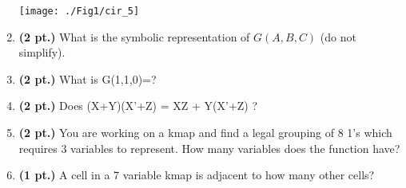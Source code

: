 \documentclass{article}
\begin{document}
\begin{enumerate}
\texttt{[image: ./Fig1/cir\_5]}

\item {\bf (2 pt.)} What is the symbolic representation of $G(A,B,C)$ 
(do not simplify).

\item {\bf (2 pt.)} What is G(1,1,0)=?

\item {\bf (2 pt.)} Does (X+Y)(X'+Z) = XZ + Y(X'+Z) ?

\pagebreak

\item {\bf (2 pt.)} You are working on a kmap and find a legal grouping 
of 8 1's which requires 3 variables to represent.  How many variables 
does the function have?

\item {\bf (1 pt.)} A cell in a 7 variable kmap is adjacent to how many other cells?  


\end{enumerate}
\end{document}
